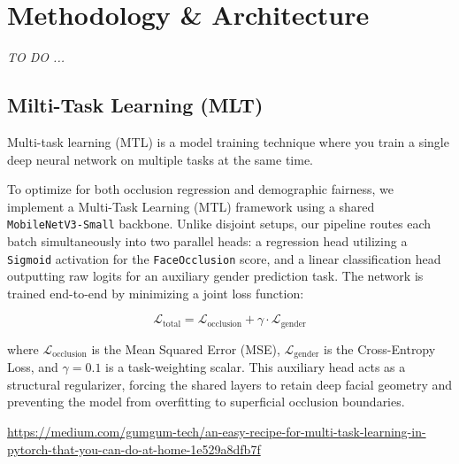\documentclass[10pt, twocolumn]{article}
\begin{document}
\section{Methodology \& Architecture}
\textit{TO DO ...}

\subsection{Milti-Task Learning (MLT)}

Multi-task learning (MTL) is a model training technique where you train a single deep neural
network on multiple tasks at the same time. 



To optimize for both occlusion regression and demographic fairness, we implement a Multi-Task Learning (MTL) framework using a shared \texttt{MobileNetV3-Small} backbone. Unlike disjoint setups, our pipeline routes each batch simultaneously into two parallel heads: a regression head utilizing a \texttt{Sigmoid} activation for the \texttt{FaceOcclusion} score, and a linear classification head outputting raw logits for an auxiliary gender prediction task. The network is trained end-to-end by minimizing a joint loss function:

\begin{equation}
\mathcal{L}_{\text{total}} = \mathcal{L}_{\text{occlusion}} + \gamma \cdot \mathcal{L}_{\text{gender}}
\end{equation}

where $\mathcal{L}_{\text{occlusion}}$ is the Mean Squared Error (MSE), $\mathcal{L}_{\text{gender}}$ is the Cross-Entropy Loss, and $\gamma = 0.1$ is a task-weighting scalar. This auxiliary head acts as a structural regularizer, forcing the shared layers to retain deep facial geometry and preventing the model from overfitting to superficial occlusion boundaries.


\url{https://medium.com/gumgum-tech/an-easy-recipe-for-multi-task-learning-in-pytorch-that-you-can-do-at-home-1e529a8dfb7f}


\end{document}
